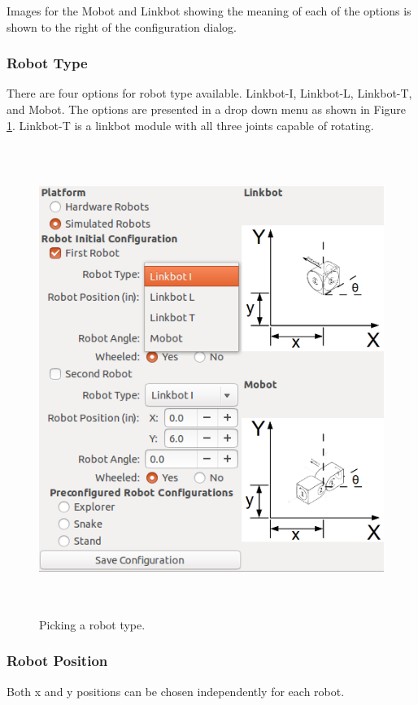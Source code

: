 \documentclass{article}
\begin{document}
Images for the Mobot and Linkbot showing the meaning of each of the options is
shown to the right of the configuration dialog.

\subsubsection{Robot Type}
There are four options for robot type available.  Linkbot-I, Linkbot-L,
Linkbot-T, and Mobot.  The options are presented in a drop down menu as shown in
Figure \ref{fig:type}.  Linkbot-T is a linkbot module with all three joints
capable of rotating.

\begin{figure}[H]
	\begin{center}
		\includegraphics[height=6in]{images/type}
	\end{center}
	\caption{Picking a robot type.}
	\label{fig:type}
\end{figure}

\subsubsection{Robot Position}
Both x and y positions can be chosen independently for each robot.
\end{document}
